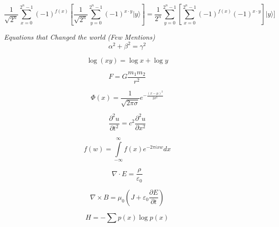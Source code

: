 \documentclass{article}
\begin{document}
	\begin{equation}\label{eqn:6}
		\frac{1}{{\sqrt {{2^n}} }}\sum\limits_{x = 0}^{{2^n} - 1} {{{( - 1)}^{f(x)}}} \left[ {\frac{1}{{\sqrt {{2^n}} }}\sum\limits_{y = 0}^{{2^n} - 1} {{{( - 1)}^{x \cdot y}}} |y\rangle } \right] = \frac{1}{{{2^n}}}\sum\limits_{y = 0}^{{2^n} - 1} {\left[ {\sum\limits_{x = 0}^{{2^n} - 1} {{{( - 1)}^{f(x)}}} {{( - 1)}^{x \cdot y}}} \right]} |y\rangle]		
	\end{equation}

	\pagebreak
	
	\textit{{\LARGE Equations that Changed the world}   (Few Mentions)}\\
	
		\[{		\alpha ^2} + {\beta ^2} = {\gamma ^2}		\]
	
	\[		\log (xy) = \log x + \log y			\]
	
	\[		F = G\frac{{m_1}{m_2}}{r^2}			\]
	
	\[      \Phi (x) = \frac{1}{\sqrt {2\pi \sigma }} {e^{ - \frac{(x - \mu )^2}  {2\sigma ^2}  }}      \]
	
	\[      \frac{{\partial ^2}u}  {\partial {t^2}}  = {c^2} \frac{{\partial ^2}u} {\partial {x^2}}     \]
	
	\[		f(w) = \int\limits_{ - \infty }^\infty  {f(x){e^{ - 2\pi ixw}}dx} 		\]
	
	\[		\nabla  \cdot E = \frac{\rho }  {\varepsilon _0}		\]
	
	\[		\nabla  \times B = {\mu _0}  \left( {J + {\varepsilon _0} \frac {\partial E}  {\partial t}} \right)		\]
	
	\[		H =  - \sum {p(x)\log p(x)} 		\]
	
\end{document}
